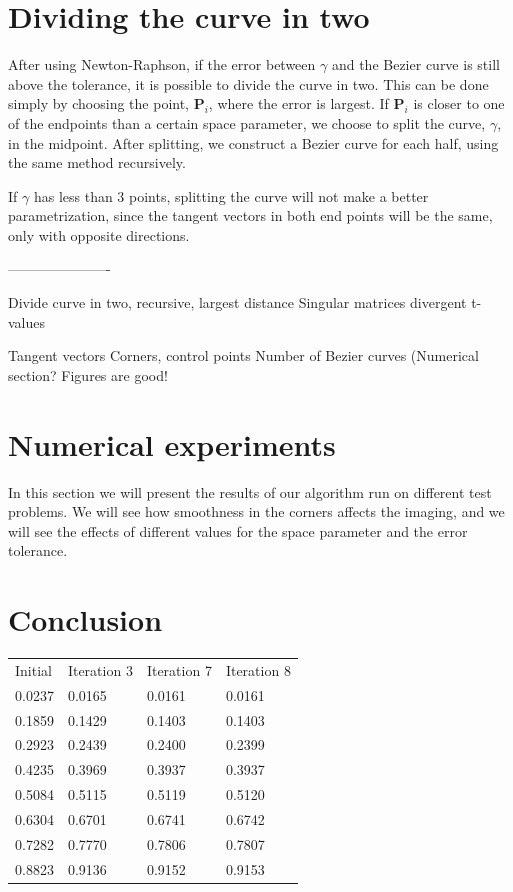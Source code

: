 \documentclass[10pt]{article}
\begin{document}
\section*{Dividing the curve in two}
After using Newton-Raphson, if the error between $\gamma$ and the Bezier curve is still above the tolerance, it is possible to divide the curve in two. This can be done simply by choosing the point, $\mathbf{P}_i$, where the error is largest. If $\mathbf{P}_i$ is closer to one of the endpoints than a certain space parameter, we choose to split the curve, $\gamma$, in the midpoint. After splitting, we construct a Bezier curve for each half, using the same method recursively. 

If $\gamma$ has less than 3 points, splitting the curve will not make a better parametrization, since the tangent vectors in both end points will be the same, only with opposite directions.

----------------------

Divide curve in two, recursive, largest distance
Singular matrices
divergent t-values


Tangent vectors
Corners, control points
Number of Bezier curves (Numerical section?
Figures are good!


\section{Numerical experiments}

In this section we will present the results of our algorithm run on different test problems. We will see how smoothness in the corners affects the imaging, and we will see the effects of different values for the space parameter and the error tolerance.






\section{Conclusion}
\cite{Plass:1983}




\begin{tabular}{ l l l l }
  Initial & Iteration 3 & Iteration 7 & Iteration 8 \\ 
  0.0237 & 0.0165 & 0.0161 & 0.0161 \\
  0.1859 & 0.1429 & 0.1403 & 0.1403 \\ 
  0.2923 & 0.2439 & 0.2400 & 0.2399 \\ 
  0.4235 & 0.3969 & 0.3937 & 0.3937 \\ 
  0.5084 & 0.5115 & 0.5119 & 0.5120 \\ 
  0.6304 & 0.6701 & 0.6741 & 0.6742 \\ 
  0.7282 & 0.7770 & 0.7806 & 0.7807 \\ 
  0.8823 & 0.9136 & 0.9152 & 0.9153 \\ 
\end{tabular}
\end{document}
